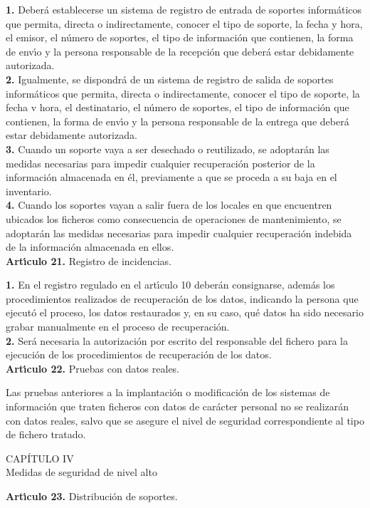 {\bf 1.} Deber\'a establecerse un sistema de registro de entrada de soportes 
inform\'aticos que permita, directa o indirectamente, conocer el tipo de 
soporte, la fecha y hora, el emisor, el n\'umero de soportes, el tipo de 
informaci\'on que contienen, la forma de env\'{\i}o y la persona responsable 
de la recepci\'on que deber\'a estar debidamente autorizada.\\

{\bf 2.} Igualmente, se dispondr\'a de un sistema de registro de salida de 
soportes inform\'aticos que permita, directa o indirectamente, conocer el tipo 
de soporte, la fecha v hora, el destinatario, el n\'umero de soportes, el tipo 
de informaci\'on que contienen, la forma de env\'{\i}o y la persona responsable 
de la entrega que deber\'a estar debidamente autorizada.\\

{\bf 3.} Cuando un soporte vaya a ser desechado o reutilizado, se adoptar\'an 
las medidas necesarias para impedir cualquier recuperaci\'on posterior de la 
informaci\'on almacenada en \'el, previamente a que se proceda a su baja en el 
inventario.\\

{\bf 4.} Cuando los soportes vayan a salir fuera de los locales en que 
encuentren ubicados los ficheros como consecuencia de operaciones de 
mantenimiento, se adoptar\'an las medidas necesarias para impedir cualquier 
recuperaci\'on indebida de la informaci\'on almacenada en ellos.
\vspace{0.3cm}\\
{\large {\bf Art\'{\i}culo 21.} Registro de incidencias.}

{\bf 1.} En el registro regulado en el art\'{\i}culo 10 deber\'an consignarse,
adem\'as los procedimientos realizados de recuperaci\'on de los datos, 
indicando la persona que ejecut\'o el proceso, los datos restaurados y, en su
caso, qu\'e datos ha sido necesario grabar manualmente en el proceso de 
recuperaci\'on.\\

{\bf 2.} Ser\'a necesaria la autorizaci\'on por escrito del responsable del 
fichero para la ejecuci\'on de los procedimientos de recuperaci\'on de los 
datos.
\vspace{0.3cm}\\
{\large {\bf Art\'{\i}culo 22.} Pruebas con datos reales.}

Las pruebas anteriores a la implantaci\'on o modificaci\'on de los sistemas de 
informaci\'on que traten ficheros con datos de car\'acter personal no se 
realizar\'an con datos reales, salvo que se asegure el nivel de seguridad 
correspondiente al tipo de fichero tratado.
\begin{center}
{\LARGE CAP\'ITULO IV}\\ {\large Medidas de seguridad de nivel alto}
\end{center}
\vspace{0.3cm}
{\large {\bf Art\'{\i}culo 23.} Distribuci\'on de soportes.}

